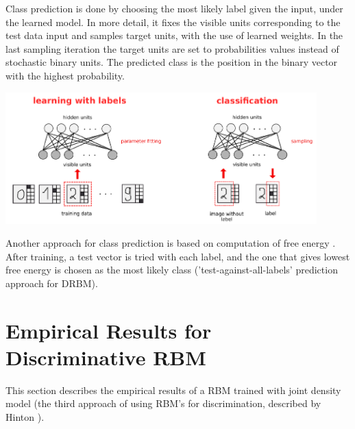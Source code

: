 \documentclass[a4paper]{scrartcl}
\begin{document}
\par Class prediction is done by choosing the most likely label given the input, under the learned model. In more detail, it fixes the visible units corresponding to the test data input and samples target units, with the use of learned weights. In the last sampling iteration the target units are set to probabilities values instead of stochastic binary units. The predicted class is the position in the binary vector with the highest probability. 
\begin{center}
\includegraphics[width=12cm]{images/DRBM.png}
\end{center}
Another approach for class prediction is based on computation of free energy \cite{Hinton}. After training, a test vector is tried with each label, and the one that gives lowest free energy is chosen as the most likely class ('test-against-all-labels' prediction approach for DRBM).
 
\newpage
 
\section{Empirical Results for Discriminative RBM}
This section describes the empirical results of a RBM trained with joint density model (the third approach of using RBM's for discrimination, described by Hinton \cite{Hinton}). 
\end{document}
